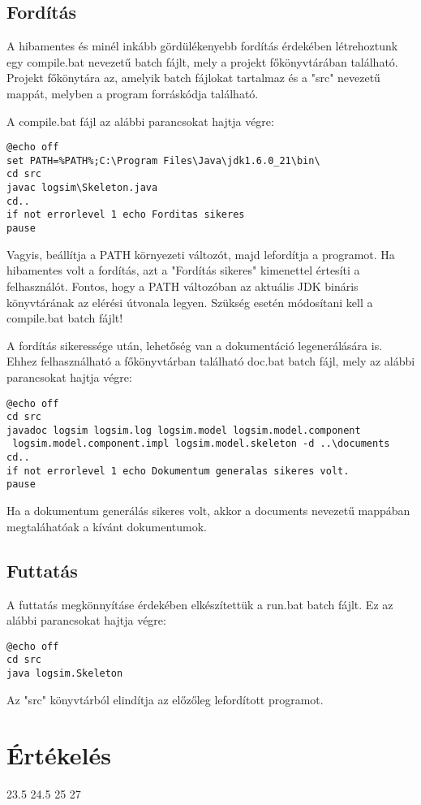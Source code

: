 \subsection{Fordítás}
A hibamentes és minél inkább gördülékenyebb fordítás érdekében létrehoztunk egy compile.bat nevezetű batch fájlt, mely a projekt főkönyvtárában található. Projekt főkönytára az, amelyik batch fájlokat tartalmaz és a "src" nevezetű mappát, melyben a program forráskódja található.

A compile.bat fájl az alábbi parancsokat hajtja végre:
\lstset{escapeinside=`', xleftmargin=10pt, frame=single, basicstyle=\ttfamily\footnotesize, language=sh}
\begin{lstlisting}
@echo off
set PATH=%PATH%;C:\Program Files\Java\jdk1.6.0_21\bin\
cd src
javac logsim\Skeleton.java
cd..
if not errorlevel 1 echo Forditas sikeres
pause
\end{lstlisting}
Vagyis, beállítja a PATH környezeti változót, majd lefordítja a programot. Ha hibamentes volt a fordítás, azt a "Fordítás sikeres" kimenettel értesíti a felhasználót.
Fontos, hogy a PATH változóban az aktuális JDK bináris könyvtárának az elérési útvonala legyen. Szükség esetén módosítani kell a compile.bat batch fájlt!


A fordítás sikeressége után, lehetőség van a dokumentáció legenerálására is. Ehhez felhasználható a főkönyvtárban található doc.bat batch fájl, mely az alábbi parancsokat hajtja végre:
\lstset{escapeinside=`', xleftmargin=10pt, frame=single, basicstyle=\ttfamily\footnotesize, language=sh}
\begin{lstlisting}
@echo off
cd src
javadoc logsim logsim.log logsim.model logsim.model.component
 logsim.model.component.impl logsim.model.skeleton -d ..\documents
cd..
if not errorlevel 1 echo Dokumentum generalas sikeres volt. 
pause
\end{lstlisting}
Ha a dokumentum generálás sikeres volt, akkor a documents nevezetű mappában megtaláhatóak a kívánt dokumentumok.



\subsection{Futtatás}
A futtatás megkönnyításe érdekében elkészítettük a run.bat batch fájlt.
Ez az alábbi parancsokat hajtja végre:
\lstset{escapeinside=`', xleftmargin=10pt, frame=single, basicstyle=\ttfamily\footnotesize, language=sh}
\begin{lstlisting}
@echo off
cd src
java logsim.Skeleton
\end{lstlisting}
Az "src" könyvtárból elindítja az előzőleg lefordított programot.


\section{Értékelés}

\begin{ertekeles}
{23.5}        %
{24.5}
{25}
{27}
\end{ertekeles}


